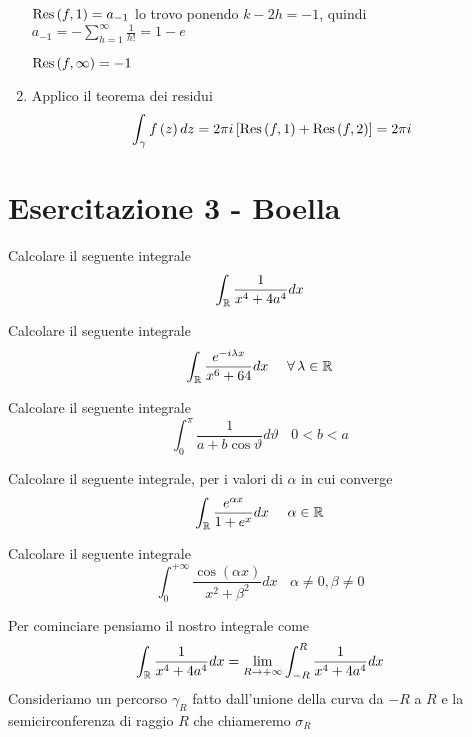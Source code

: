 \begin{enumerate}
$\operatorname{Res} \left(f,1\right) = a_{ - 1}$ lo trovo ponendo $k - 2h = -1$, quindi $a_{ - 1} = - \sum\limits ^{\infty }_{h = 1}\frac{1}{h!} = 1 - e$

$\operatorname{Res} \left(f,\infty \right) = - 1$
\item Applico il teorema dei residui\begin{equation*}
\int\nolimits _{\gamma } f\left(z\right) dz = 2\pi i\left[\operatorname{Res} \left(f,1\right) + \operatorname{Res} \left(f,2\right)\right] = 2\pi i
\end{equation*}
\end{enumerate}
\chapter{Esercitazione 3 - Boella}
\ParteEsercizi
\Esercizio{}

Calcolare il seguente integrale
\begin{equation*}
\int _{\mathbb{R} }\frac{1}{x^{4} + 4a^{4}} dx
\end{equation*}
\Esercizio{}

Calcolare il seguente integrale
\begin{equation*}
\int _{\RR }\frac{e^{ - i\lambda x}}{x^{6} + 64} dx\ \ \ \ \forall \lambda \in \RR 
\end{equation*}
\Esercizio{}

Calcolare il seguente integrale
\begin{equation*}
\int ^{\pi }_{0}\frac{1}{a + b\cos \vartheta } d\vartheta \ \ \ \ 0 < b < a
\end{equation*}
\Esercizio{}

Calcolare il seguente integrale, per i valori di $\alpha $ in cui converge
\begin{equation*}
\int _{\mathbb{R} }\frac{e^{\alpha x}}{1 + e^{x}} dx\ \ \ \ \alpha \in \mathbb{R} 
\end{equation*}
\Esercizio{}

Calcolare il seguente integrale
\begin{equation*}
\int ^{ + \infty }_{0}\frac{\cos\left(\alpha x\right)}{x^{2} + \beta ^{2}} dx\ \ \ \ \alpha \neq 0,\beta \neq 0
\end{equation*}
\ParteSoluzioni
\Soluzione

Per cominciare pensiamo il nostro integrale come
\begin{equation*}
\int _{\mathbb{R} }\frac{1}{x^{4} + 4a^{4}} dx = \lim\limits _{R\rightarrow + \infty }\int ^{R}_{ - R}\frac{1}{x^{4} + 4a^{4}} dx
\end{equation*}
Consideriamo un percorso $\gamma _{R}$ fatto dall'unione della curva da $ - R$ a $R$ e la semicirconferenza di raggio $R$ che chiameremo $\sigma _{R}$


